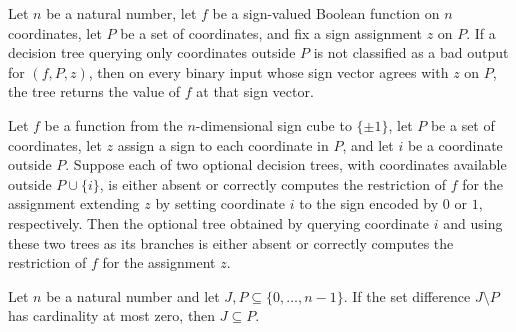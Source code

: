 \begin{theorem}
\label{FABL.computesJuntaRestriction_of_not_outputBad}
\leanok
{}
Let $n$ be a natural number, let $f$ be a sign-valued Boolean function on $n$
coordinates, let $P$ be a set of coordinates, and fix a sign assignment $z$ on $P$. If a
decision tree querying only coordinates outside $P$ is not classified as a bad output
for $(f,P,z)$, then on every binary input whose sign vector agrees with $z$ on $P$, the
tree returns the value of $f$ at that sign vector.
\end{theorem}

\begin{theorem}
\label{FABL.not_outputBad_assembleJuntaQuery}
\leanok
{}
Let $f$ be a function from the $n$-dimensional sign cube to $\{\pm1\}$, let $P$ be a set
of coordinates, let $z$ assign a sign to each coordinate in $P$, and let $i$ be a
coordinate outside $P$. Suppose each of two optional decision trees, with coordinates
available outside $P\cup\{i\}$, is either absent or correctly computes the restriction
of $f$ for the assignment extending $z$ by setting coordinate $i$ to the sign encoded by
$0$ or $1$, respectively. Then the optional tree obtained by querying coordinate $i$ and
using these two trees as its branches is either absent or correctly computes the
restriction of $f$ for the assignment $z$.
\end{theorem}

\begin{theorem}
\label{FABL.subset_of_card_sdiff_le_zero}
\leanok
{}
Let $n$ be a natural number and let $J,P\subseteq\{0,\ldots,n-1\}$. If the set
difference $J\setminus P$ has cardinality at most zero, then $J\subseteq P$.
\end{theorem}

